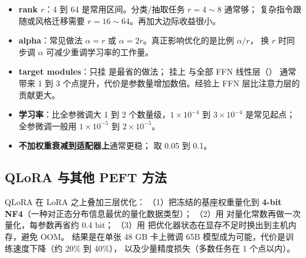 \begin{formulacard}
\begin{itemize}
  \item \textbf{rank $r$}：4 到 64 是常用区间。分类/抽取任务 $r = 4 \sim 8$ 通常够；
        复杂指令跟随或风格迁移需要 $r = 16 \sim 64$。再加大边际收益很小。
  \item \textbf{alpha}：常见做法 $\alpha = r$ 或 $\alpha = 2r$。真正影响优化的是比例 $\alpha / r$，
        换 $r$ 时同步调 $\alpha$ 可减少重调学习率的工作量。
  \item \textbf{target modules}：只挂  是最省的做法；
        挂上  与全部 FFN 线性层（）
        通常带来 1 到 3 个点提升，代价是参数量增加数倍。经验上 FFN 层比注意力层的贡献更大。
  \item \textbf{学习率}：比全参微调大 1 到 2 个数量级，$1\times10^{-4}$ 到 $3\times10^{-4}$ 是常见起点；
        全参微调一般用 $1\times10^{-5}$ 到 $2\times10^{-5}$。
  \item \textbf{不加权重衰减到适配器上}通常更稳； 取 0.05 到 0.1。
\end{itemize}
\end{formulacard}

\subsection{QLoRA 与其他 PEFT 方法}

QLoRA 在 LoRA 之上叠加三层优化：
（1）把冻结的基座权重量化到 \textbf{4-bit NF4}（一种对正态分布信息最优的量化数据类型）；
（2）用 对量化常数再做一次量化，每参数再省约 0.4 bit；
（3）用 把优化器状态在显存不足时换出到主机内存，避免 OOM。
结果是在单张 48 GB 卡上微调 65B 模型成为可能，代价是训练速度下降（约 20\% 到 40\%），
以及少量精度损失（多数任务在 1 个点以内）。

